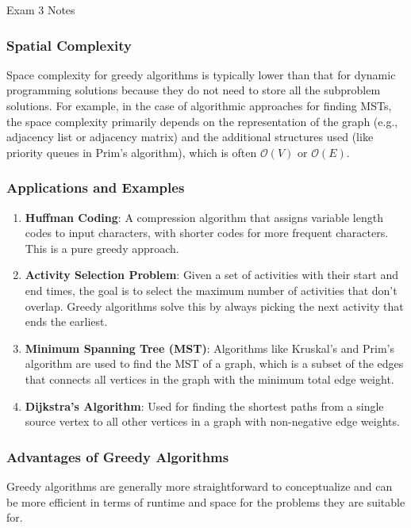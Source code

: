 \begin{examnotes}{Exam 3 Notes}
    \subsubsection*{Spatial Complexity}

    Space complexity for greedy algorithms is typically lower than that for dynamic programming solutions because they do not need to store all the subproblem solutions. For example, in the case of 
    algorithmic approaches for finding MSTs, the space complexity primarily depends on the representation of the graph (e.g., adjacency list or adjacency matrix) and the additional structures used 
    (like priority queues in Prim's algorithm), which is often $\mathcal{O}(V)$ or $\mathcal{O}(E)$.

    \subsubsection*{Applications and Examples}

    \begin{enumerate}
        \item \textbf{Huffman Coding}: A compression algorithm that assigns variable length codes to input characters, with shorter codes for more frequent characters. This is a pure greedy approach.
        \item \textbf{Activity Selection Problem}: Given a set of activities with their start and end times, the goal is to select the maximum number of activities that don't overlap. Greedy algorithms 
        solve this by always picking the next activity that ends the earliest.
        \item \textbf{Minimum Spanning Tree (MST)}: Algorithms like Kruskal's and Prim's algorithm are used to find the MST of a graph, which is a subset of the edges that connects all vertices in the 
        graph with the minimum total edge weight.
        \item \textbf{Dijkstra's Algorithm}: Used for finding the shortest paths from a single source vertex to all other vertices in a graph with non-negative edge weights.
    \end{enumerate}

    \subsubsection*{Advantages of Greedy Algorithms}

    Greedy algorithms are generally more straightforward to conceptualize and can be more efficient in terms of runtime and space for the problems they are suitable for.


\end{examnotes}
